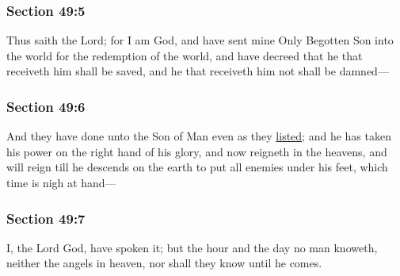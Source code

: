 	\subsubsection{Section 49:5} %
		\label{DC49-5}

		Thus saith the Lord; for I am God, and have sent mine Only Begotten Son into the world for the redemption of the world, and have decreed that he that receiveth him shall be saved, and he that receiveth him not shall be damned---


	\subsubsection{Section 49:6} %
		\label{DC49-6}

		And they have done unto the Son of Man even as they \hyperref[LIST]{listed}; and he has taken his power on the right hand of his glory, and now reigneth in the heavens, and will reign till he descends on the earth to put all enemies under his feet, which time is nigh at hand---


	\subsubsection{Section 49:7} %
		\label{DC49-7}

		I, the Lord God, have spoken it; but the hour and the day no man knoweth, neither the angels in heaven, nor shall they know until he comes.


